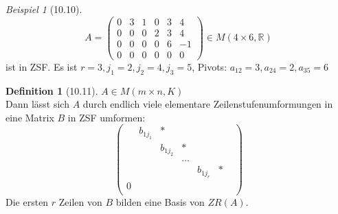 \documentclass[a4paper]{scrartcl}
\theoremstyle{definition}
\newtheorem{defn}{Definition}
\theoremstyle{plain}
\theoremstyle{plain}
\theoremstyle{remark}
\theoremstyle{remark}
\theoremstyle{remark}
\theoremstyle{remark}
\theoremstyle{remark}
\newtheorem{ex}{Beispiel}
\begin{document}
\begin{ex}[10.10]
\begin{equation}
A =
\begin{pmatrix}
0 & 3 & 1 & 0 & 3 & 4 \\
0 & 0 & 0 & 2 & 3 & 4 \\
0 & 0 & 0 & 0 & 6 & -1 \\
0 & 0 & 0 & 0 & 0 & 0
\end{pmatrix}
\in M(4\times 6, \mathbb{R})
\end{equation}
ist in ZSF. Es ist $r = 3, j_1 = 2, j_2 = 4, j_3 = 5$, Pivots: $a_{12} = 3, a_{24} = 2, a_{35} = 6$
\end{ex}
\begin{defn}[10.11]
$A \in M(m\times n, K)$ \\
  Dann lässt sich $A$ durch endlich viele elementare Zeilenstufenumformungen in eine Matrix $B$ in ZSF umformen:
\begin{equation}
\begin{pmatrix}
& b_{1j_1} & \ast & & & & \\
& & b_{1j_2} & \ast & & & \\
& & & \ldots & & \\
& & & & b_{1j_r} & \ast & \\
0 & & & & & & \\
\end{pmatrix}
\end{equation}
Die ersten $r$ Zeilen von $B$ bilden eine Basis von $ZR(A)$.
\end{defn}
\end{document}
